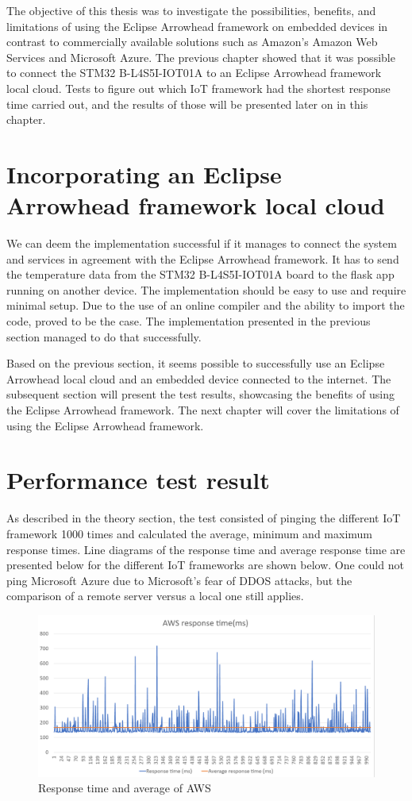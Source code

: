 The objective of this thesis was to investigate the possibilities, benefits, and limitations of using the Eclipse Arrowhead framework on embedded devices in contrast to commercially available solutions such
as Amazon's Amazon Web Services and Microsoft Azure. 
The previous chapter showed that it was possible to connect the STM32 B-L4S5I-IOT01A to an Eclipse Arrowhead framework local cloud.
Tests to figure out which IoT framework had the shortest response time carried out, and the results of those will be presented later on in this chapter.

\section{Incorporating an Eclipse Arrowhead framework local cloud}
We can deem the implementation successful if it manages to connect the system and services in agreement with the Eclipse Arrowhead framework.
It has to send the temperature data from the STM32 B-L4S5I-IOT01A board to the flask app running on another device.
The implementation should be easy to use and require minimal setup.
Due to the use of an online compiler and the ability to import the code, proved to be the case.  
The implementation presented in the previous section managed to do that successfully.

Based on the previous section, it seems possible to successfully use an Eclipse Arrowhead local cloud and an embedded device connected to the internet. 
The subsequent section will present the test results, showcasing the benefits of using the Eclipse Arrowhead framework.
The next chapter will cover the limitations of using the Eclipse Arrowhead framework.

\section{Performance test result}
As described in the theory section, the test consisted of pinging the different IoT framework 1000 times and calculated the average, minimum and maximum response times. 
Line diagrams of the response time and average response time are presented below for the different IoT frameworks are shown below.
One could not ping Microsoft Azure due to Microsoft's fear of DDOS attacks, but the comparison of a remote server versus a local one still applies.  
\begin{figure}[h!]
    \centering
    \includegraphics[width=\textwidth]{Pictures/AWS_response_time.png} 
    \caption{Response time and average of AWS}
    \label{AWS response time}
\end{figure}

